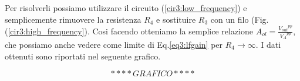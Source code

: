 Per risolverli possiamo utilizzare il circuito (\ref{cir3:low_frequency}) e semplicemente rimuovere la resistenza $R_4$ e sostituire $R_3$ con un filo (Fig. (\ref{cir3:high_frequency}). Cosi facendo otteniamo la semplice relazione $A_{ol}=\frac{{V_{out}}^{pp}}{{V_A}^{pp}}$, che possiamo anche vedere come limite di Eq.\ref{eq3:lfgain} per $R_4 \rightarrow \infty$. I dati ottenuti sono riportati nel seguente grafico. 

$$****GRAFICO****$$

